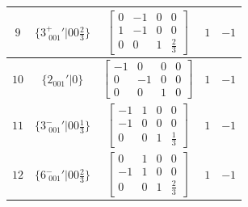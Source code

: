 \documentclass[fleqn,8pt]{jsarticle}
\begin{document}
\begin{longtable}{ccccc}
$ 9 $ & $ \{3^{+}_{\,\,001}{}'|0 0 \frac{2}{3}\} $ & $ \begin{bmatrix} 0 & -1 & 0 & 0 \\ 1 & -1 & 0 & 0 \\ 0 & 0 & 1 & \frac{2}{3} \end{bmatrix} $ & $ 1 $ & $ -1 $ \\ \hline
$ 10 $ & $ \{2{}_{001}{}'|0\} $ & $ \begin{bmatrix} -1 & 0 & 0 & 0 \\ 0 & -1 & 0 & 0 \\ 0 & 0 & 1 & 0 \end{bmatrix} $ & $ 1 $ & $ -1 $ \\ \hline
$ 11 $ & $ \{3^{-}_{\,\,001}{}'|0 0 \frac{1}{3}\} $ & $ \begin{bmatrix} -1 & 1 & 0 & 0 \\ -1 & 0 & 0 & 0 \\ 0 & 0 & 1 & \frac{1}{3} \end{bmatrix} $ & $ 1 $ & $ -1 $ \\ \hline
$ 12 $ & $ \{6^{-}_{\,\,001}{}'|0 0 \frac{2}{3}\} $ & $ \begin{bmatrix} 0 & 1 & 0 & 0 \\ -1 & 1 & 0 & 0 \\ 0 & 0 & 1 & \frac{2}{3} \end{bmatrix} $ & $ 1 $ & $ -1 $ \\
\end{longtable}
\end{document}
